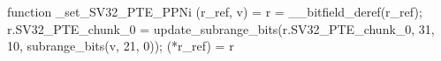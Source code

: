 function _set_SV32_PTE_PPNi (r_ref, v) = {
    r = __bitfield_deref(r_ref);
    r.SV32_PTE_chunk_0 = update_subrange_bits(r.SV32_PTE_chunk_0, 31, 10, subrange_bits(v, 21, 0));
    (*r_ref) = r
}

